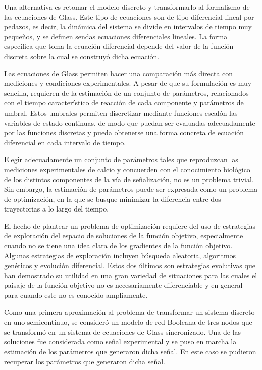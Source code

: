 Una alternativa es retomar el modelo discreto y transformarlo al formalismo de las ecuaciones de Glass. Este tipo de ecuaciones son de tipo diferencial lineal por pedazos, es decir, la dinámica del sistema se divide en intervalos de tiempo muy pequeños, y se definen sendas ecuaciones diferenciales lineales. La forma específica que toma la ecuación diferencial depende del valor de la función discreta sobre la cual se construyó dicha ecuación.

Las ecuaciones de Glass permiten hacer una comparación más directa con mediciones y condiciones experimentales. A pesar de que su formulación es muy sencilla, requieren de la estimación de un conjunto de parámetros, relacionados con el tiempo característico de reacción de cada componente y parámetros de umbral. Estos umbrales permiten discretizar mediante funciones escalón las variables de estado continuas, de modo que puedan ser evaluadas adecuadamente por las funciones discretas y pueda obtenerse una forma concreta de ecuación diferencial en cada intervalo de tiempo.

Elegir adecuadamente un conjunto de parámetros tales que reproduzcan las mediciones experimentales de calcio y concuerden con el conocimiento biológico de los distintos componentes de la vía de señalización, no es un problema trivial. Sin embargo, la estimación de parámetros puede ser expresada como un problema de optimización, en la que se busque minimizar la diferencia entre dos trayectorias a lo largo del tiempo.

El hecho de plantear un problema de optimización requiere del uso de estrategias de exploración del espacio de soluciones de la función objetivo, especialmente cuando no se tiene una idea clara de los gradientes de la función objetivo. Algunas estrategias de exploración incluyen búsqueda aleatoria, algoritmos genéticos y evolución diferencial. Estos dos últimos son estrategias evolutivas que han demostrado su utilidad en una gran variedad de situaciones para las cuales el paisaje de la función objetivo no es necesariamente diferenciable y en general para cuando este no es conocido ampliamente.

Como una primera aproximación al problema de transformar un sistema discreto en uno semicontinuo, se consideró un modelo de red Booleana de tres nodos que se transformó en un sistema de ecuaciones de Glass sincronizado. Una de las soluciones fue considerada como señal experimental y se puso en marcha la estimación de los parámetros que generaron dicha señal. En este caso se pudieron recuperar los parámetros que generaron dicha señal.

